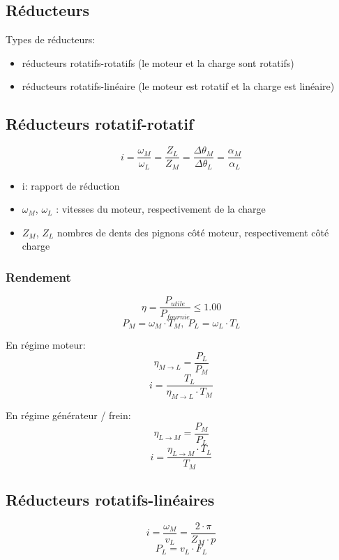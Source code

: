 \documentclass[10pt]{article} %
\begin{document}
\begin{multicols}{3}
\begin{flushleft}
	\section*{Réducteurs}
		
		Types de réducteurs:
		
		\begin{itemize}
			\item réducteurs rotatifs-rotatifs (le moteur et la charge sont rotatifs)
			\item réducteurs rotatifs-linéaire (le moteur est rotatif et la charge est linéaire)
		\end{itemize}
	
		\subsection*{Réducteurs rotatif-rotatif}
		
		
			\[i = \frac{\omega_M}{\omega_L} = \frac{Z_L}{Z_M} = \frac{\Delta \theta_M}{\Delta \theta_L} = \frac{\alpha_M}{\alpha_L} \]
		
			\begin{itemize}
				\item i: rapport de réduction
				\item $\omega_M$, $\omega_L$ : vitesses du moteur, respectivement de la charge
				\item $Z_M$, $Z_L$ nombres de dents des pignons côté moteur, respectivement côté charge
			\end{itemize}
		
		\subsubsection*{Rendement}
		
			\[\eta = \frac{P_{utile}}{P_{fournie}} \leq 1.00 \]
			\[P_M = \omega_M \cdot T_M,\; P_L= \omega_L \cdot T_L \]
			
			En régime moteur:
			\[\eta_{M \rightarrow L} = \frac{P_L}{P_M} \]
			\[i = \frac{T_L}{\eta_{M \rightarrow L} \cdot T_M} \]
			
			En régime générateur / frein:
			\[\eta_{L \rightarrow M} = \frac{P_M}{P_L} \]
			\[i = \frac{\eta_{L \rightarrow M} \cdot T_L}{T_M} \]
		
		\subsection*{Réducteurs rotatifs-linéaires}
		
			\[i = \frac{\omega_M}{v_L} = \frac{2 \cdot \pi}{Z_M \cdot p} \]
			\[P_L = v_L \cdot F_L \]
			

\end{flushleft}
\end{multicols}
\end{document}
